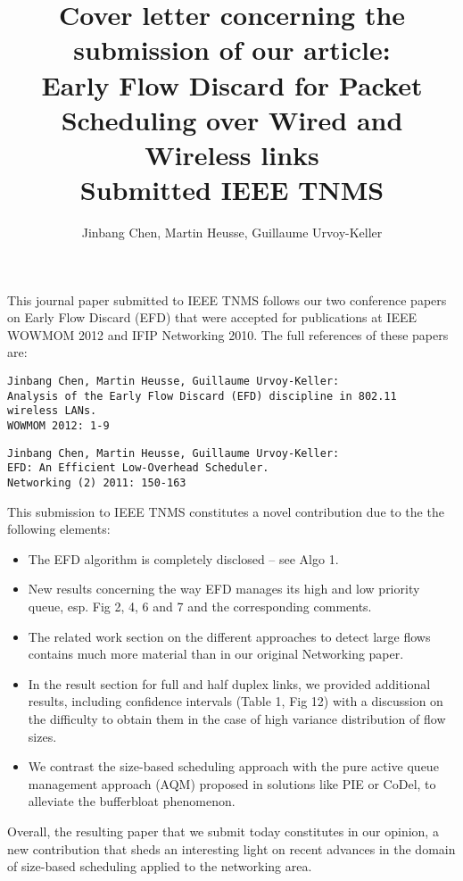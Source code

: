 \documentclass{article}
\title{{\small Cover letter concerning the submission of our article:}\\
Early Flow Discard for Packet Scheduling over Wired and Wireless links\\
{\small Submitted IEEE TNMS}
}
\author{Jinbang Chen, Martin Heusse, Guillaume Urvoy-Keller}
\begin{document}
\maketitle


This journal paper submitted to IEEE TNMS follows our two conference papers on Early Flow Discard (EFD) that were accepted for publications at IEEE WOWMOM 2012 and IFIP Networking 2010. The full references of these papers are:

\begin{verbatim}
Jinbang Chen, Martin Heusse, Guillaume Urvoy-Keller:
Analysis of the Early Flow Discard (EFD) discipline in 802.11 
wireless LANs.
WOWMOM 2012: 1-9
\end{verbatim}

\begin{verbatim}
Jinbang Chen, Martin Heusse, Guillaume Urvoy-Keller:
EFD: An Efficient Low-Overhead Scheduler. 
Networking (2) 2011: 150-163
\end{verbatim}

This submission to IEEE TNMS constitutes a novel contribution due to the the following elements:
\begin{itemize}
\item
The EFD algorithm is completely disclosed -- see Algo 1.
\item 
New results concerning the way EFD manages its high and low priority queue, esp. Fig 2, 4, 6 and 7 and the corresponding comments.
\item 
The related work section on the different approaches to detect large flows contains much more material than in our original Networking paper. 
\item 
In the result section  for full and half duplex links, we provided additional results, including confidence intervals (Table 1, Fig 12) with  a discussion on the difficulty to obtain them in the case of high variance distribution of flow sizes.
\item We contrast the size-based scheduling approach with the pure active queue management approach (AQM) proposed in solutions like PIE or CoDel, to alleviate the bufferbloat phenomenon.
\end{itemize}

Overall, the resulting paper that we submit today constitutes in our opinion, a new contribution that sheds an interesting light on recent advances in the domain of size-based scheduling applied to the networking area.
\end{document}
